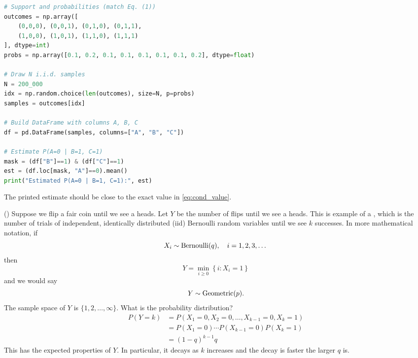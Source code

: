 \begin{example}
\begin{lstlisting}[language=Python]
# Support and probabilities (match Eq. (1))
outcomes = np.array([
    (0,0,0), (0,0,1), (0,1,0), (0,1,1),
    (1,0,0), (1,0,1), (1,1,0), (1,1,1)
], dtype=int)
probs = np.array([0.1, 0.2, 0.1, 0.1, 0.1, 0.1, 0.1, 0.2], dtype=float)

# Draw N i.i.d. samples
N = 200_000
idx = np.random.choice(len(outcomes), size=N, p=probs)
samples = outcomes[idx]

# Build DataFrame with columns A, B, C
df = pd.DataFrame(samples, columns=["A", "B", "C"])

# Estimate P(A=0 | B=1, C=1)
mask = (df["B"]==1) & (df["C"]==1)
est = (df.loc[mask, "A"]==0).mean()
print("Estimated P(A=0 | B=1, C=1):", est)
\end{lstlisting}
The printed estimate should be close to the exact value in \eqref{eq:cond_value}.
\end{example}

\begin{example}(\cite[Example 2.3.4]{evans})
Suppose we flip a fair coin until we see a heads. Let $Y$ be the number of flips until we see a heads. This is example of a  , which is the number of trials of independent, identically distributed (iid) Bernoulli random variables until we see $k$ successes. In more mathematical notation, if
\begin{equation*}
X_i \sim {\rm Bernoulli}(q), \quad i = 1,2,3,\dots
\end{equation*}
then 
\begin{equation*}
Y = \min_{i\ge0}\left\{i:X_i=1 \right\}
\end{equation*} 
and we would say 
\begin{equation*}
Y \sim {\rm Geometric}(p).
\end{equation*}
The sample space of $Y$ is $\{1,2,\dots,\infty\}$. What is the probability distribution? 
\begin{align*}
P(Y=k) &= P(X_1=0,X_2=0,\dots,X_{k-1}=0,X_k=1) \\
&= P(X_1 = 0) \cdots  P(X_{k-1}=0)P(X_k=1) \\
&= (1-q)^{k-1}q
\end{align*}
This has the expected properties of $Y$. In particular, it decays as $k$ increases and the decay is faster the larger $q$ is. 

\end{example}






